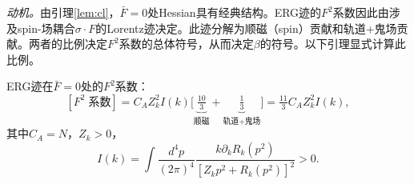 \documentclass[12pt,a4paper]{article}
\theoremstyle{plain}
\theoremstyle{definition}\newtheorem{definition}[theorem]{定义}
\theoremstyle{remark}\newtheorem{remark}[theorem]{注记}
\begin{document}
\textit{动机。}由引理\ref{lem:cl}，$\bar{F}=0$处Hessian具有经典结构。ERG迹的$F^2$系数因此由涉及spin-场耦合$\sigma\cdot F$的Lorentz迹决定。此迹分解为顺磁（spin）贡献和轨道$+$鬼场贡献。两者的比例决定$F^2$系数的总体符号，从而决定$\beta$的符号。以下引理显式计算此比例。

\begin{lemma}[Lorentz代数保护：$10{:}1$]\label{lem:101}
ERG迹在$\bar{F}=0$处的$F^2$系数：
\begin{equation}\label{eq:F2decomp}
[F^2\;\text{系数}] = C_AZ_k^2I(k)\Big[\underbrace{\tfrac{10}{3}}_{\text{顺磁}}+\underbrace{\tfrac{1}{3}}_{\text{轨道+鬼场}}\Big] = \tfrac{11}{3}C_AZ_k^2I(k),
\end{equation}
其中$C_A=N$，$Z_k>0$，
\begin{equation}\label{eq:Ik}
I(k) = \int\frac{d^4p}{(2\pi)^4}\frac{k\partial_kR_k(p^2)}{[Z_kp^2+R_k(p^2)]^2} > 0.
\end{equation}
\end{lemma}
\end{document}
